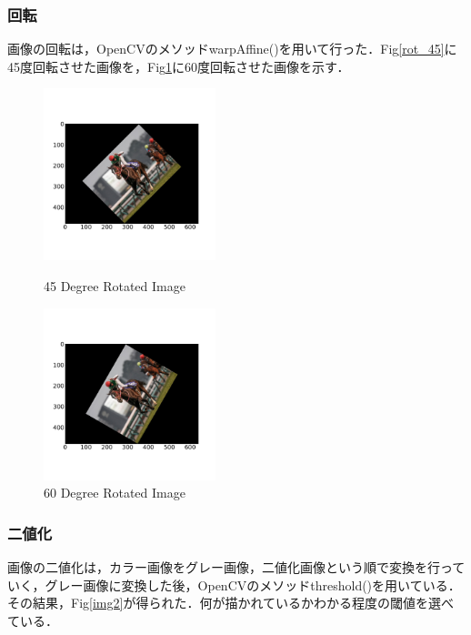 \documentclass[11pt,a4j]{jarticle}
\begin{document}
\subsubsection{回転}
画像の回転は，OpenCVのメソッドwarpAffine()を用いて行った．Fig\ref{rot_45}に45度回転させた画像を，Fig\ref{rot_60}に60度回転させた画像を示す．
\begin{figure}[ht]
	\begin{minipage}{0.5\hsize}
		\centering
		\includegraphics[width=5cm]{../1_BasicImageProcessing/output/rot_45.jpg}
		\vspace{-1cm}
		\renewcommand{\figurename}{Fig}
		\caption{45 Degree Rotated Image}
		\label{rot_45}
	\end{minipage}
	\begin{minipage}{0.5\hsize}
		\centering
		\includegraphics[width=5cm]{../1_BasicImageProcessing/output/rot_60.jpg}
		\vspace{-1cm}
		\renewcommand{\figurename}{Fig}
		\caption{60 Degree Rotated Image}
		\label{rot_60}
	\end{minipage}
\end{figure}

\subsubsection{二値化}
画像の二値化は，カラー画像をグレー画像，二値化画像という順で変換を行っていく，グレー画像に変換した後，OpenCVのメソッドthreshold()を用いている．その結果，Fig\ref{img2}が得られた．何が描かれているかわかる程度の閾値を選べている．
\end{document}
